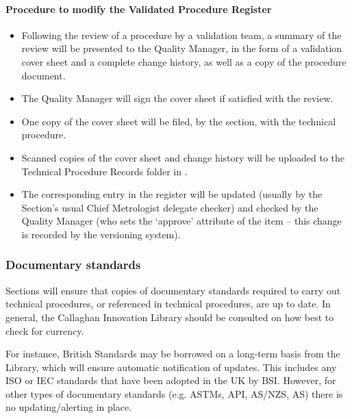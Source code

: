 \paragraph{Procedure to modify the Validated Procedure Register}
\begin{itemize}
\item Following the review of a procedure by a validation team, a summary of the review will be presented to the Quality Manager, in the form of a validation cover sheet and a complete change history, as well as a copy of the procedure document.
\item The Quality Manager will sign the cover sheet if satisfied with the review.
\item One copy of the cover sheet will be filed, by the section, with the technical procedure. 
\item Scanned copies of the cover sheet and change history will be uploaded to the Technical Procedure Records folder in .
\item The corresponding entry in the register will be updated (usually by the Section's usual Chief Metrologist delegate checker) and checked by the Quality Manager (who sets the ‘approve’ attribute of the item – this change is recorded by the  versioning system).
\end{itemize} 

\subsubsection{Documentary standards}
Sections will ensure that copies of documentary standards required to carry out technical procedures, or referenced in technical procedures, are up to date. 
In general, the Callaghan Innovation Library should be consulted on how best to check for currency.

For instance, British Standards may be borrowed on a long-term basis from the Library, which will ensure automatic notification of updates. This includes any ISO or IEC standards that have been adopted in the UK by BSI. However, for other types of documentary standards (e.g. ASTMs, API, AS/NZS, AS) there is no updating/alerting in place. 